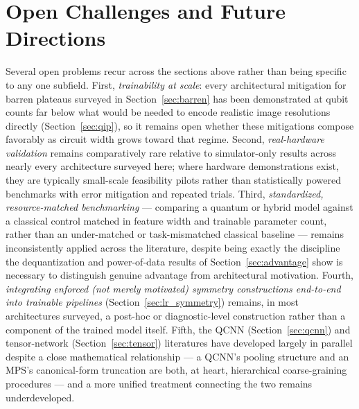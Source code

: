 \documentclass[11pt]{article}
\begin{document}
\section{Open Challenges and Future Directions}
\label{sec:challenges}
Several open problems recur across the sections above rather than being specific to any one subfield. First, \emph{trainability at scale}: every architectural mitigation for barren plateaus surveyed in Section~\ref{sec:barren} has been demonstrated at qubit counts far below what would be needed to encode realistic image resolutions directly (Section~\ref{sec:qip}), so it remains open whether these mitigations compose favorably as circuit width grows toward that regime. Second, \emph{real-hardware validation} remains comparatively rare relative to simulator-only results across nearly every architecture surveyed here; where hardware demonstrations exist, they are typically small-scale feasibility pilots rather than statistically powered benchmarks with error mitigation and repeated trials. Third, \emph{standardized, resource-matched benchmarking} — comparing a quantum or hybrid model against a classical control matched in feature width and trainable parameter count, rather than an under-matched or task-mismatched classical baseline — remains inconsistently applied across the literature, despite being exactly the discipline the dequantization and power-of-data results of Section~\ref{sec:advantage} show is necessary to distinguish genuine advantage from architectural motivation. Fourth, \emph{integrating enforced (not merely motivated) symmetry constructions end-to-end into trainable pipelines} (Section~\ref{sec:lr_symmetry}) remains, in most architectures surveyed, a post-hoc or diagnostic-level construction rather than a component of the trained model itself. Fifth, the QCNN (Section~\ref{sec:qcnn}) and tensor-network (Section~\ref{sec:tensor}) literatures have developed largely in parallel despite a close mathematical relationship — a QCNN's pooling structure and an MPS's canonical-form truncation are both, at heart, hierarchical coarse-graining procedures — and a more unified treatment connecting the two remains underdeveloped.
\end{document}
